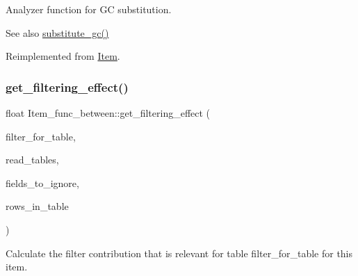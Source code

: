 Analyzer function for GC substitution. \begin{DoxySeeAlso}{See also}
\mbox{\hyperlink{group__Query__Optimizer_gaa95a062cdd785687a638e01d7ad85d11}{substitute\+\_\+gc()}} 
\end{DoxySeeAlso}


Reimplemented from \mbox{\hyperlink{classItem_aea5d6f41e9cd5d17d8e6e8d44bee9c3e}{Item}}.

\mbox{\label{classItem__func__between_a84b7522d374dbbd2246a28b43d9224e8}} 
\subsubsection{\texorpdfstring{get\+\_\+filtering\+\_\+effect()}{get\_filtering\_effect()}}
{\footnotesize\ttfamily float Item\+\_\+func\+\_\+between\+::get\+\_\+filtering\+\_\+effect (\begin{DoxyParamCaption}\item[{table\+\_\+map}]{filter\+\_\+for\+\_\+table,  }\item[{table\+\_\+map}]{read\+\_\+tables,  }\item[{const M\+Y\+\_\+\+B\+I\+T\+M\+AP $\ast$}]{fields\+\_\+to\+\_\+ignore,  }\item[{double}]{rows\+\_\+in\+\_\+table }\end{DoxyParamCaption})\hspace{0.3cm}{\ttfamily [virtual]}}

Calculate the filter contribution that is relevant for table \textquotesingle{}filter\+\_\+for\+\_\+table\textquotesingle{} for this item.


